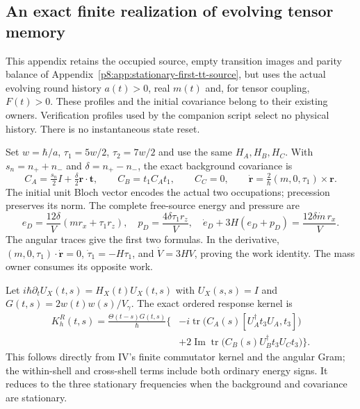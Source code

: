 \documentclass[12pt,a4paper]{article}
\begin{document}
\subsection{An exact finite realization of evolving tensor memory}
\label{p8:app:evolving-first-tt-source}
This appendix retains the occupied source, empty transition images and
parity balance of Appendix~\ref{p8:app:stationary-first-tt-source}, but
uses the actual evolving round history $a(t)>0$, real $m(t)$ and, for
tensor coupling, $F(t)>0$. These profiles and the initial covariance belong
to their existing owners. Verification profiles used by the companion
script select no physical history. There is no instantaneous state reset.

Set $w=\hbar/a$, $\tau_1=5w/2$, $\tau_2=7w/2$ and use the same $H_A,H_B,H_C$.
With $s_n=n_++n_-$ and $\delta=n_+-n_-$, the exact background covariance is
\[
 C_A=\tfrac{s_n}{2}I+\tfrac\delta2\mathbf r\cdot\mathbf t,
 \qquad C_B=t_1C_At_1,\qquad C_C=0,
 \qquad \dot{\mathbf r}=\tfrac2\hbar(m,0,\tau_1)\times\mathbf r.
\]
The initial unit Bloch vector encodes the actual two occupations; precession
preserves its norm. The complete free-source energy and pressure are
\[
 e_D=\frac{12\delta}{V}(mr_x+\tau_1r_z),\quad
 p_D=\frac{4\delta\tau_1r_z}{V},\quad
 \dot e_D+3H(e_D+p_D)=\frac{12\delta\dot m\,r_x}{V}.
\]
The angular traces give the first two formulas. In the derivative,
$(m,0,\tau_1)\cdot\dot{\mathbf r}=0$,
$\dot\tau_1=-H\tau_1$, and $\dot V=3HV$, proving the work identity.
The mass owner consumes its opposite work.

Let $i\hbar\partial_tU_X(t,s)=H_X(t)U_X(t,s)$ with $U_X(s,s)=I$ and
$G(t,s)=2w(t)w(s)/V_\gamma$. The exact ordered response kernel is
\begin{align*}
 K_h^R(t,s)=\frac{\Theta(t-s)G(t,s)}{\hbar}\bigl\{
 &-i\operatorname{tr}\bigl(C_A(s)
                 [U_A^\dagger t_3U_A,t_3]\bigr)\\
 &+2\operatorname{Im}\operatorname{tr}
       \bigl(C_B(s)U_B^\dagger t_3U_Ct_3\bigr)\bigr\}.
\end{align*}
This follows directly from IV's finite commutator kernel and the angular
Gram; the within-shell and cross-shell terms include both ordinary energy
signs. It reduces to the three stationary frequencies when the background
and covariance are stationary.
\end{document}
